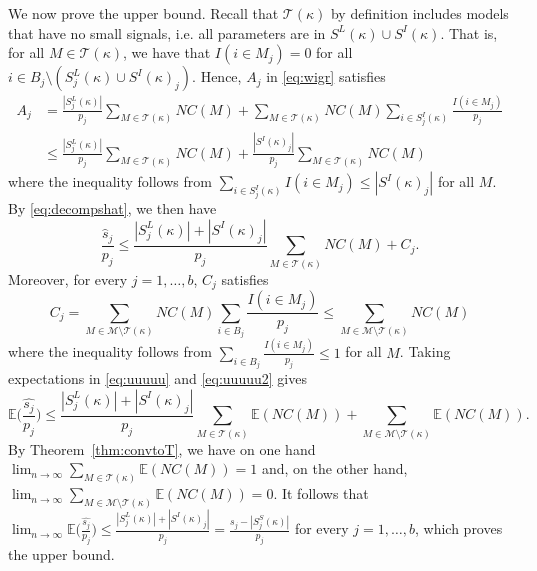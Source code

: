 \documentclass[bj,authoryear]{imsart}
\theoremstyle{plain}
\newcommand{\E}{\mathbb{E}}
\newcommand{\M}{\mathcal{M}}
\newcommand{\T}{\mathcal{T}}
\begin{document}
We now prove the upper bound. Recall that $\T(\kappa)$ by definition includes models that have no small signals, i.e. all parameters are in $S^L(\kappa) \cup S^I(\kappa)$. That is,
for all $M\in\T(\kappa)$, we have that $I(i\in M_j)=0$ for all $i\in B_j\setminus(S^{L}_j(\kappa)\cup S^{I}(\kappa)_j)$. Hence, $A_j$ in \eqref{eq:wigr} satisfies
\begin{align*}
    A_j
   &= \frac{|S^{L}_j(\kappa)|}{p_j}\sum_{M \in \T(\kappa)}NC(M)+\sum_{M \in \T(\kappa)}NC(M)\sum_{i \in S^{I}_j(\kappa)}\frac{I(i\in M_j)}{p_j}\\
   &\leq\frac{|S^{L}_j(\kappa)|}{p_j}\sum_{M \in \T(\kappa)}NC(M)+ \frac{|S^{I}(\kappa)_j|}{p_j}\sum_{M \in \T(\kappa)}NC(M)
\end{align*}
where the inequality follows from $\sum_{i \in S^{I}_j(\kappa)} I(i\in M_j) \leq |S^{I}(\kappa)_j|$  for all $M$. By \eqref{eq:decompshat}, we then have
\begin{equation}\label{eq:uuuuu}
    \frac{\hat{s}_j}{p_j}\leq \frac{|S^{L}_j(\kappa)|+|S^{I}(\kappa)_j|}{p_j}\sum_{M \in \T(\kappa)}NC(M) + C_j.
\end{equation}
Moreover, for every $j=1,\ldots,b$, $C_j$ satisfies
\begin{equation}\label{eq:uuuuu2}
    C_j = \sum_{M \in \M\setminus \T(\kappa)}NC(M)\sum_{i \in B_j}\frac{I(i\in M_j)}{p_j}\leq \sum_{M \in \M\setminus \T(\kappa)}NC(M)
\end{equation}
where the inequality follows from $\sum_{i \in B_j}\frac{I(i\in M_j)}{p_j}\leq 1$ for all $M$.
Taking expectations in \eqref{eq:uuuuu} and \eqref{eq:uuuuu2} gives
\begin{equation*}
    \E\bigg(\frac{\widehat{s_j}}{p_j}\bigg) 
    \leq \frac{|S^{L}_j(\kappa)|+|S^{I}(\kappa)_j|}{p_j}\sum_{M \in \T(\kappa)}\E(NC(M)) + \sum_{M \in \M\setminus \T(\kappa)}\E(NC(M)).
\end{equation*}
 By Theorem~\ref{thm:convtoT}, we have on one hand $\lim_{n\to \infty}\sum_{M \in \T(\kappa)}\E(NC(M))= 1$ and, on the other hand, $\lim_{n\to \infty}\sum_{M \in \M\setminus\T(\kappa)}\E(NC(M))= 0$. It follows that $ \lim_{n\to \infty}\E\big(\frac{\widehat{s_j}}{p_j}\big) \leq  \frac{|S^{L}_j(\kappa)|+|S^{I}(\kappa)_j|}{p_j}= \frac{s_j-|S^{S}_j(\kappa)|}{p_j}$ for every $j=1,\ldots,b$, which proves the upper bound.
\end{document}
